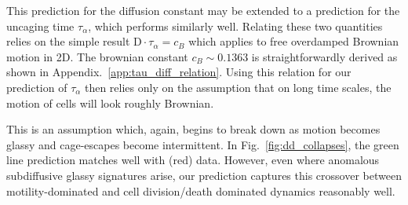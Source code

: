 \documentclass[
reprint
,aps
,amssymb
,amsmath
,superscriptaddress
]{revtex4-1}
\begin{document}
This prediction for the diffusion constant may be extended to a prediction for the uncaging time $\tau_\alpha$, which performs similarly well. Relating these two quantities relies on the simple result $ \mathrm{D} \cdot \tau_\alpha = c_B $ which applies to free overdamped Brownian motion in 2D. The brownian constant $c_B \sim 0.1363$ is straightforwardly derived as shown in Appendix.~\ref{app:tau_diff_relation}. Using this relation for our prediction of $\tau_\alpha$ then relies only on the assumption that on long time scales, the motion of cells will look roughly Brownian.

This is an assumption which, again, begins to break down as motion becomes glassy and cage-escapes become intermittent. In Fig.~\ref{fig:dd_collapses}, the green line prediction matches well with (red) data. However, even where anomalous subdiffusive glassy signatures arise, our prediction captures this crossover between motility-dominated and cell division/death dominated dynamics reasonably well.






\end{document}
